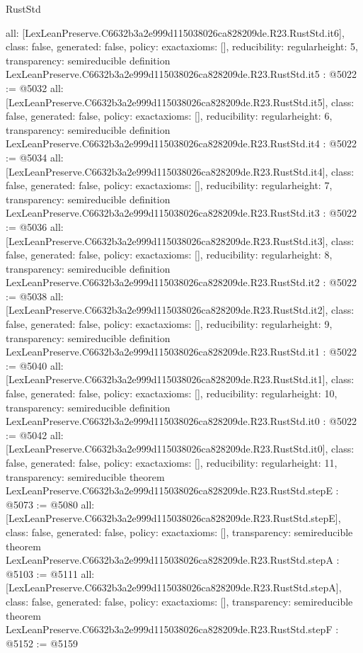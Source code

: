 \begin{lexlean}{RustStd}
\begin{coremodule}
{  all: [LexLeanPreserve.C6632b3a2e999d115038026ca828209de.R23.RustStd.it6],
  class: false,
  generated: false,
  policy: exact{axioms: []},
  reducibility: regular{height: 5},
  transparency: semireducible
}
definition LexLeanPreserve.C6632b3a2e999d115038026ca828209de.R23.RustStd.it5 : @5022 := @5032 {
  all: [LexLeanPreserve.C6632b3a2e999d115038026ca828209de.R23.RustStd.it5],
  class: false,
  generated: false,
  policy: exact{axioms: []},
  reducibility: regular{height: 6},
  transparency: semireducible
}
definition LexLeanPreserve.C6632b3a2e999d115038026ca828209de.R23.RustStd.it4 : @5022 := @5034 {
  all: [LexLeanPreserve.C6632b3a2e999d115038026ca828209de.R23.RustStd.it4],
  class: false,
  generated: false,
  policy: exact{axioms: []},
  reducibility: regular{height: 7},
  transparency: semireducible
}
definition LexLeanPreserve.C6632b3a2e999d115038026ca828209de.R23.RustStd.it3 : @5022 := @5036 {
  all: [LexLeanPreserve.C6632b3a2e999d115038026ca828209de.R23.RustStd.it3],
  class: false,
  generated: false,
  policy: exact{axioms: []},
  reducibility: regular{height: 8},
  transparency: semireducible
}
definition LexLeanPreserve.C6632b3a2e999d115038026ca828209de.R23.RustStd.it2 : @5022 := @5038 {
  all: [LexLeanPreserve.C6632b3a2e999d115038026ca828209de.R23.RustStd.it2],
  class: false,
  generated: false,
  policy: exact{axioms: []},
  reducibility: regular{height: 9},
  transparency: semireducible
}
definition LexLeanPreserve.C6632b3a2e999d115038026ca828209de.R23.RustStd.it1 : @5022 := @5040 {
  all: [LexLeanPreserve.C6632b3a2e999d115038026ca828209de.R23.RustStd.it1],
  class: false,
  generated: false,
  policy: exact{axioms: []},
  reducibility: regular{height: 10},
  transparency: semireducible
}
definition LexLeanPreserve.C6632b3a2e999d115038026ca828209de.R23.RustStd.it0 : @5022 := @5042 {
  all: [LexLeanPreserve.C6632b3a2e999d115038026ca828209de.R23.RustStd.it0],
  class: false,
  generated: false,
  policy: exact{axioms: []},
  reducibility: regular{height: 11},
  transparency: semireducible
}
theorem LexLeanPreserve.C6632b3a2e999d115038026ca828209de.R23.RustStd.stepE : @5073 := @5080 {
  all: [LexLeanPreserve.C6632b3a2e999d115038026ca828209de.R23.RustStd.stepE],
  class: false,
  generated: false,
  policy: exact{axioms: []},
  transparency: semireducible
}
theorem LexLeanPreserve.C6632b3a2e999d115038026ca828209de.R23.RustStd.stepA : @5103 := @5111 {
  all: [LexLeanPreserve.C6632b3a2e999d115038026ca828209de.R23.RustStd.stepA],
  class: false,
  generated: false,
  policy: exact{axioms: []},
  transparency: semireducible
}
theorem LexLeanPreserve.C6632b3a2e999d115038026ca828209de.R23.RustStd.stepF : @5152 := @5159 {
}
\end{coremodule}
\end{lexlean}
